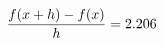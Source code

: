 \documentclass[preview]{standalone}
\begin{document}
\begin{align*}
\special{dvisvgm:raw <g id='unique000'>}\frac{f(x+h)-f(x)}{h} = 2.206\special{dvisvgm:raw </g>}
\end{align*}
\end{document}
